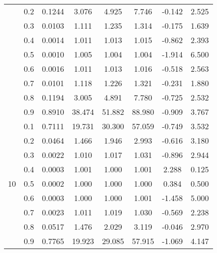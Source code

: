 \documentclass[11pt,a4paper]{report}
\begin{document}
\begin{longtable}{ | c | c || c | c | c | c | c | c | }
 & 0.2 & 0.1244 & 3.076 & 4.925 & 7.746 & -0.142 & 2.525 \\
 & 0.3 & 0.0103 & 1.111 & 1.235 & 1.314 & -0.175 & 1.639 \\
 & 0.4 & 0.0014 & 1.011 & 1.013 & 1.015 & -0.862 & 2.393 \\
 & 0.5 & 0.0010 & 1.005 & 1.004 & 1.004 & -1.914 & 6.500 \\
 & 0.6 & 0.0016 & 1.011 & 1.013 & 1.016 & -0.518 & 2.563 \\
 & 0.7 & 0.0101 & 1.118 & 1.226 & 1.321 & -0.231 & 1.880 \\
 & 0.8 & 0.1194 & 3.005 & 4.891 & 7.780 & -0.725 & 2.532 \\
 & 0.9 & 0.8910 & 38.474 & 51.882 & 88.980 & -0.909 & 3.767 \\
 \hline
\multirow{9}{*}{10} & 0.1 & 0.7111 & 19.731 & 30.300 & 57.059 & -0.749 & 3.532 \\
 & 0.2 & 0.0464 & 1.466 & 1.946 & 2.993 & -0.616 & 3.180 \\
 & 0.3 & 0.0022 & 1.010 & 1.017 & 1.031 & -0.896 & 2.944 \\
 & 0.4 & 0.0003 & 1.001 & 1.000 & 1.001 & 2.288 & 0.125 \\
 & 0.5 & 0.0002 & 1.000 & 1.000 & 1.000 & 0.384 & 0.500 \\
 & 0.6 & 0.0003 & 1.000 & 1.000 & 1.001 & -1.458 & 5.000 \\
 & 0.7 & 0.0023 & 1.011 & 1.019 & 1.030 & -0.569 & 2.238 \\
 & 0.8 & 0.0517 & 1.476 & 2.029 & 3.119 & -0.046 & 2.970 \\
 & 0.9 & 0.7765 & 19.923 & 29.085 & 57.915 & -1.069 & 4.147 \\
 \hline
\hline
\end{longtable}
\end{document}
